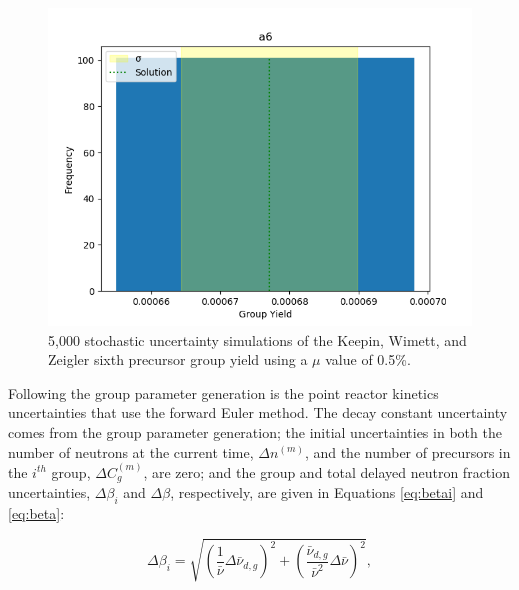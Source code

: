 \documentclass{style/nseJournal}
\begin{document}
\begin{figure}
    \centering
    \includegraphics[scale=0.55]{images/ga6-yield-MC.png}
    \caption{5,000 stochastic uncertainty simulations of the Keepin, Wimett, and Zeigler sixth precursor group yield using a $\mu$ value of 0.5\%.}
    \label{fig:a6-uncert}
\end{figure}





Following the group parameter generation is the point reactor kinetics uncertainties that use the forward Euler method. The decay constant uncertainty comes from the group parameter generation; the initial uncertainties in both the number of neutrons at the current time, $\Delta n^{(m)}$, and the number of precursors in the $i^{th}$ group, $\Delta C_g^{(m)}$, are zero; and the group and total delayed neutron fraction uncertainties, $\Delta \beta_{i}$ and $\Delta \beta$, respectively, are given in Equations \eqref{eq:betai} and \eqref{eq:beta}:


\begin{equation}
\Delta \beta_{i} = \sqrt{ \left(\frac{1}{\bar{\nu}} \Delta\bar{\nu}_{d, g} \right)^2 +
\left( \frac{\bar{\nu}_{d, g}}{\bar{\nu}^2} \Delta \bar{\nu} \right)^2}
\label{eq:betai},
\end{equation}
\end{document}
